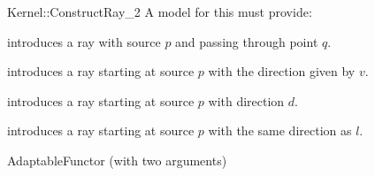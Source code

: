 \begin{ccRefFunctionObjectConcept}{Kernel::ConstructRay_2}
A model for this must provide:


            {introduces a ray  
             with source $p$ and passing through point $q$.}

            {introduces a ray starting at source $p$ with 
             the direction given by $v$.}

            {introduces a ray  starting at source $p$ with 
             direction $d$.}

            {introduces a ray  starting at source $p$ with 
             the same direction as $l$.}

\ccRefines
AdaptableFunctor (with two arguments)

\ccSeeAlso
{}\\

\end{ccRefFunctionObjectConcept}
